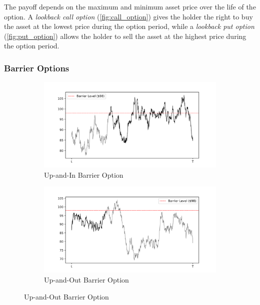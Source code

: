 \documentclass[a4paper]{report}
\begin{document}
\noindent The payoff depends on the maximum and minimum asset price over the life of the option. A \textit{lookback call option} (\autoref{fig:call_option}) gives the holder the right to buy the asset at the lowest price during the option period, while a \textit{lookback put option} (\autoref{fig:put_option}) allows the holder to sell the asset at the highest price during the option period.

\subsubsection{Barrier Options}
\begin{figure}[H]
    \begin{subfigure}{.5\linewidth}
      \includegraphics[width=\linewidth]{images/up_in_option.png}
      \caption{Up-and-In Barrier Option}
    \end{subfigure}\hfill
    \begin{subfigure}{.5\linewidth}
      \includegraphics[width=\linewidth]{images/up_out_option.png}
      \caption{Up-and-Out Barrier Option}
    \end{subfigure}
    

\end{figure}
\end{document}
